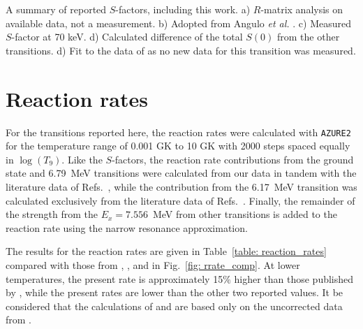 \begin{table}
\begin{threeparttable}
\begin{tablenotes}
\small 
\item A summary of reported $S$-factors, including this work. a) $R$-matrix analysis on available data, not a measurement. b) Adopted from Angulo \textit{et al.} \cite{Angulo2001}. c) Measured $S$-factor at 70 keV. d) Calculated difference of the total $S(0)$ from the other transitions. d) Fit to the data of \cite{Schroder1987, Runkle2005, Imbriani2005} as no new data for this transition was measured.
\end{tablenotes}
\end{threeparttable}
\label{table: new_s_factors}
\end{table}




\section{Reaction rates}
\label{sec: reaction rates}


For the transitions reported here, the reaction rates were calculated with \texttt{AZURE2} for the temperature range of 0.001 GK to 10 GK with 2000 steps spaced equally in $\log(T_{9})$. Like the $S$-factors, the reaction rate contributions from the ground state and 6.79~MeV transitions were calculated from our data in tandem with the literature data of Refs.~\cite{Formicola2004, Imbriani2005, Marta2008, Marta2011, Runkle2005, Schroder1987, Li2016, Wagner2018}, while the contribution from the 6.17~MeV transition was calculated exclusively from the literature data of Refs.~\cite{Runkle2005, Imbriani2005, Schroder1987}. Finally, the remainder of the strength from the $E_{x}= 7.556$~MeV from other transitions is added to the reaction rate using the narrow resonance approximation.

The results for the reaction rates are given in Table~\ref{table: reaction_rates} compared with those from \citet{Caughlan1988}, \citet{Angulo1999}, and \citet{Imbriani2005} in Fig.~\ref{fig: rrate_comp}. At lower temperatures, the present rate is approximately 15$\%$ higher than those published by \citet{Imbriani2005}, while the present rates are lower than the other two reported values. It be considered that the calculations of \citet{Caughlan1988} and \citet{Angulo1999} are based only on the uncorrected data from \citet{Schroder1987}. 


